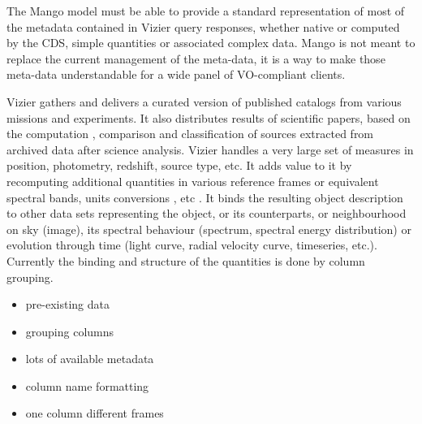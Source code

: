 \documentclass[11pt,a4paper]{ivoa}
\begin{document}
The Mango model must be able to provide a standard representation of most of the metadata contained in Vizier query responses, whether native or computed  by the CDS, simple quantities or associated complex data.
Mango is not meant to replace the current management of the meta-data, it is a way to make those meta-data understandable for a wide panel of VO-compliant clients.

%
%
%
%


Vizier gathers and delivers a curated version of published catalogs from various missions and experiments.
It also distributes results of scientific papers, based on the computation , comparison and classification of sources extracted from archived data after science analysis.
Vizier handles a very large set of measures in position, photometry, redshift, source type, etc.
It adds value to it by recomputing additional quantities in various reference frames or equivalent spectral bands, units conversions , etc .
It binds the resulting object description to other data sets representing the object, or its counterparts, or neighbourhood on sky (image), its spectral behaviour (spectrum, spectral energy distribution) or evolution through time (light curve, radial velocity curve, timeseries, etc.).
Currently the binding and structure of the quantities is done by column grouping.
\begin{itemize}
    \item pre-existing data
    \item grouping columns
    \item lots of available metadata
    \item column name formatting
    \item one column different frames
\end{itemize}
\end{document}
